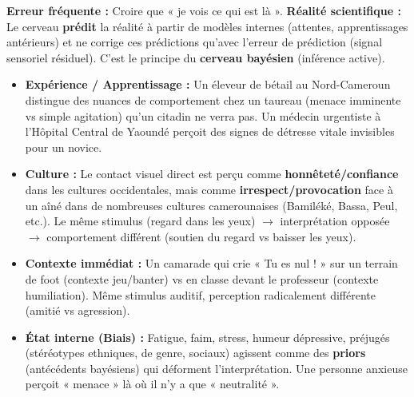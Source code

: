 \documentclass[11pt]{article}
\begin{document}
\begin{attention}
\textbf{Erreur fréquente :} Croire que « je vois ce qui est là ». \textbf{Réalité scientifique :} Le cerveau \textbf{prédit} la réalité à partir de modèles internes (attentes, apprentissages antérieurs) et ne corrige ces prédictions qu'avec l'erreur de prédiction (signal sensoriel résiduel). C'est le principe du \textbf{cerveau bayésien} (inférence active).
\begin{itemize}
    \item \textbf{Expérience / Apprentissage :} Un éleveur de bétail au Nord-Cameroun distingue des nuances de comportement chez un taureau (menace imminente vs simple agitation) qu'un citadin ne verra pas. Un médecin urgentiste à l'Hôpital Central de Yaoundé perçoit des signes de détresse vitale invisibles pour un novice.
    \item \textbf{Culture :} Le contact visuel direct est perçu comme \textbf{honnêteté/confiance} dans les cultures occidentales, mais comme \textbf{irrespect/provocation} face à un aîné dans de nombreuses cultures camerounaises (Bamiléké, Bassa, Peul, etc.). Le même stimulus (regard dans les yeux) $\to$ interprétation opposée $\to$ comportement différent (soutien du regard vs baisser les yeux).
    \item \textbf{Contexte immédiat :} Un camarade qui crie « Tu es nul ! » sur un terrain de foot (contexte jeu/banter) vs en classe devant le professeur (contexte humiliation). Même stimulus auditif, perception radicalement différente (amitié vs agression).
    \item \textbf{État interne (Biais) :} Fatigue, faim, stress, humeur dépressive, préjugés (stéréotypes ethniques, de genre, sociaux) agissent comme des \textbf{priors} (antécédents bayésiens) qui déforment l'interprétation. Une personne anxieuse perçoit « menace » là où il n'y a que « neutralité ».
\end{itemize}
\end{attention}
\end{document}
